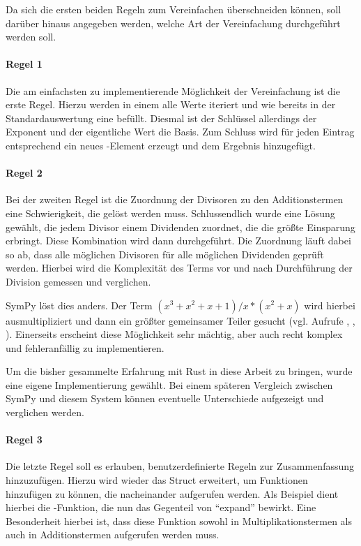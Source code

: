 \documentclass[11pt,a4paper, ngerman]{article}
\begin{document}
Da sich die ersten beiden Regeln zum Vereinfachen überschneiden können, soll darüber hinaus angegeben werden, welche Art der Vereinfachung durchgeführt werden soll.

\paragraph{Regel 1} Die am einfachsten zu implementierende Möglichkeit der Vereinfachung ist die erste Regel. Hierzu werden in einem  alle Werte iteriert und wie bereits in der Standardauswertung eine  befüllt. Diesmal ist der Schlüssel allerdings der Exponent und der eigentliche Wert die Basis. Zum Schluss wird für jeden Eintrag entsprechend ein neues -Element erzeugt und dem Ergebnis hinzugefügt.

\paragraph{Regel 2} Bei der zweiten Regel ist die Zuordnung der Divisoren zu den Additionstermen eine Schwierigkeit, die gelöst werden muss. Schlussendlich wurde eine Lösung gewählt, die jedem Divisor einem Dividenden zuordnet, die die größte Einsparung erbringt. Diese Kombination wird dann durchgeführt. Die Zuordnung läuft dabei so ab, dass alle möglichen Divisoren für alle möglichen Dividenden geprüft werden. Hierbei wird die Komplexität des Terms vor und nach Durchführung der Division gemessen und verglichen.

SymPy löst dies anders. Der Term $(x^3+x^2+x+1)/x*(x^2+x)$ wird hierbei ausmultipliziert und dann ein größter gemeinsamer Teiler gesucht (vgl. \cite{SymPySimplifySrc} Aufrufe , , ). Einerseits erscheint diese Möglichkeit sehr mächtig, aber auch recht komplex und fehleranfällig zu implementieren.

\label{sec:Regel2Simp}
Um die bisher gesammelte Erfahrung mit Rust in diese Arbeit zu bringen, wurde eine eigene Implementierung gewählt. Bei einem späteren Vergleich zwischen SymPy und diesem System können eventuelle Unterschiede aufgezeigt und verglichen werden.

\paragraph{Regel 3} Die letzte Regel soll es erlauben, benutzerdefinierte Regeln zur Zusammenfassung hinzuzufügen. Hierzu wird wieder das Struct  erweitert, um Funktionen hinzufügen zu können, die nacheinander aufgerufen werden. Als Beispiel dient hierbei die -Funktion, die nun das Gegenteil von ``expand'' bewirkt. Eine Besonderheit hierbei ist, dass diese Funktion sowohl in Multiplikationstermen als auch in Additionstermen aufgerufen werden muss.
\end{document}
